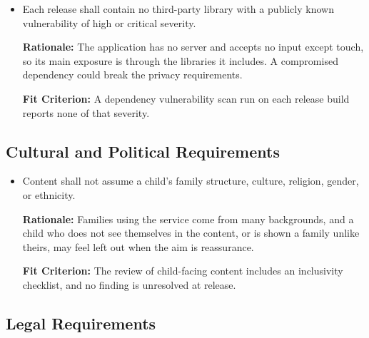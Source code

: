 \documentclass[12pt]{article}
\newcounter{nfrnum} %
\begin{document}
\begin{itemize}
\item[\refstepcounter{nfrnum}\textbf{NFR\thenfrnum}\label{NFR_Immunity}:]
Each release shall contain no third-party library with a publicly known vulnerability of high or critical severity.

\textbf{Rationale:} The application has no server and accepts no input except touch, so its main exposure is through the libraries it includes. A compromised dependency could break the privacy requirements.

\textbf{Fit Criterion:} A dependency vulnerability scan run on each release build reports none of that severity.

\end{itemize}

\subsection{Cultural and Political Requirements}

\begin{itemize}

\item[\refstepcounter{nfrnum}\textbf{NFR\thenfrnum}\label{NFR_Inclusivity}:]
Content shall not assume a child's family structure, culture, religion, gender, or ethnicity.

\textbf{Rationale:} Families using the service come from many backgrounds, and a child who does not see themselves in the content, or is shown a family unlike theirs, may feel left out when the aim is reassurance.

\textbf{Fit Criterion:} The review of child-facing content includes an inclusivity checklist, and no finding is unresolved at release.

\end{itemize}

\subsection{Legal Requirements}
\end{document}
